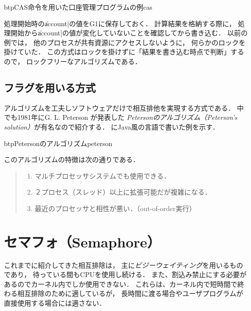 \begin{itemize}
  \begin{myfig}{btp}{CAS命令を用いた口座管理プログラムの例}{cas}
    
  \end{myfig}

  処理開始時の\|account|の値をG1に保存しておく．
  計算結果を格納する際に，
  処理開始から\|account|の値が変化していないことを確認してから書き込む．
  以前の例では，
  他のプロセスが共有資源にアクセスしないように，
  何らかのロックを掛けていた．
  この方式はロックを掛けずに「結果を書き込む時点で判断」するので，
  ロックフリーなアルゴリズムである．
\end{itemize}

\subsection{フラグを用いる方式}
アルゴリズムを工夫しソフトウェアだけで相互排他を実現する方式である．
中でも1981年にG. L. Peterson が発表した
\emph{Petersonのアルゴリズム（Peterson's solution）}が有名なので紹介する．
にJava風の言語で書いた例を示す．

\begin{myfig}{btp}{Petersonのアルゴリズム}{peterson}
  
\end{myfig}

このアルゴリズムの特徴は次の通りである．

\begin{quote}
  \begin{enumerate}
  \item マルチプロセッサシステムでも使用できる．
  \item ２プロセス（スレッド）以上に拡張可能だが複雑になる．
  \item 最近のプロセッサと相性が悪い．（out-of-order実行）
  \end{enumerate}
\end{quote}

\section{セマフォ（Semaphore）}
これまでに紹介してきた相互排除は，
主に\emph{ビジーウェイティング}を用いるものであり，
待っている間もCPUを使用し続ける．
また、割込み禁止にする必要があるのでカーネル内でしか使用できない．
これらは、カーネル内で短時間で終わる相互排除のために適しているが，
長時間に渡る場合やユーザプログラムが直接使用する場合には適さない．

